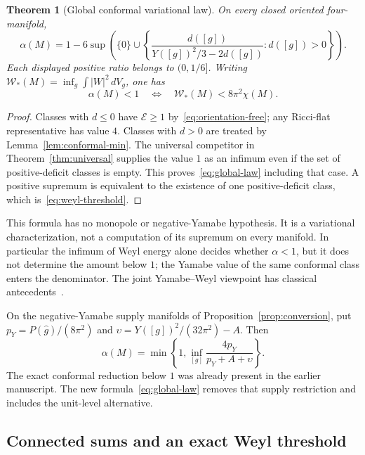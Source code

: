 \documentclass[11pt]{article}
\newcommand{\dd}{\,dV_g}
\newcommand{\cE}{\mathcal E}
\newtheorem{theorem}{Theorem}[section]
\theoremstyle{definition}
\theoremstyle{remark}
\begin{document}
\begin{theorem}[Global conformal variational law]
\label{thm:global-law}
On every closed oriented four-manifold,
\begin{equation}
 \boxed{\alpha(M)=1-6\sup\left(
 \{0\}\cup\left\{
 \frac{d([g])}{Y([g])^2/3-2d([g])}:d([g])>0
 \right\}\right).}
 \label{eq:global-law}
\end{equation}
Each displayed positive ratio belongs to $(0,1/6]$.
Writing $\mathcal W_*(M)=\inf_g\int|W|^2\dd$, one has
\begin{equation}
 \boxed{\alpha(M)<1
       \quad\Longleftrightarrow\quad
       \mathcal W_*(M)<8\pi^2\chi(M).}
 \label{eq:weyl-threshold}
\end{equation}
\end{theorem}
\begin{proof}
Classes with $d\le0$ have $\cE\ge1$ by~\eqref{eq:orientation-free};
any Ricci-flat representative has value $4$.
Classes with $d>0$ are treated by Lemma~\ref{lem:conformal-min}.
The universal competitor in Theorem~\ref{thm:universal} supplies the
value $1$ as an infimum even if the set of positive-deficit classes is empty.
This proves~\eqref{eq:global-law} including that case.
A positive supremum is equivalent to the existence of one
positive-deficit class, which is~\eqref{eq:weyl-threshold}.
\end{proof}

This formula has no monopole or negative-Yamabe hypothesis. It is a
variational characterization, not a computation of its supremum on
every manifold. In particular the infimum of Weyl energy alone decides
whether $\alpha<1$, but it does not determine the amount below $1$;
the Yamabe value of the same conformal class enters the denominator.
The joint Yamabe--Weyl viewpoint has classical antecedents~\cite{ABKS}.

On the negative-Yamabe supply manifolds of
Proposition~\ref{prop:conversion}, put
$p_Y=P(\widehat g)/(8\pi^2)$ and
$\upsilon=Y([g])^2/(32\pi^2)-A$. Then
\begin{equation}
 \alpha(M)=\min\left\{1,
       \inf_{[g]}\frac{4p_Y}{p_Y+A+\upsilon}\right\}.
 \label{eq:supply-quotient}
\end{equation}
The exact conformal reduction below $1$ was already present in the
earlier manuscript. The new formula~\eqref{eq:global-law} removes that
supply restriction and includes the unit-level alternative.

\subsection{Connected sums and an exact Weyl threshold}
\end{document}
